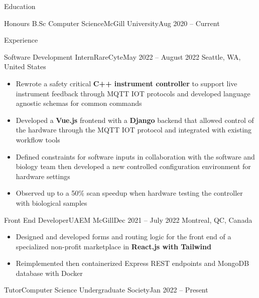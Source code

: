 \documentclass[]{mcdowellcv}
\begin{document}
\let\CITY=S

\let\WEB=F

\makeheader

\begin{cvsection}{Education}
	\begin{cvsubsection}{\normalfont Honours B.Sc Computer Science}{McGill University}{Aug 2020 -- Current}
	\end{cvsubsection}
	\vspace{-13mm}
\end{cvsection}
\begin{cvsection}{Experience}
	\begin{cvsubsection}{Software Development Intern}{RareCyte}{May 2022 -- August 2022}
		Seattle, WA, United States
		\begin{itemize}%
			\item Rewrote a safety critical \textbf{C++ instrument controller} to support live instrument feedback through MQTT IOT protocols and developed language agnostic schemas for common commands
			\item Developed a \textbf{Vue.js} frontend with a \textbf{Django} backend that allowed control of the hardware through the MQTT IOT protocol and integrated with existing workflow tools
			\item Defined constraints for software inputs in collaboration with the software and biology team then developed a new controlled configuration environment for hardware settings
			\item Observed up to a 50\% scan speedup when hardware testing the controller with biological samples
		\end{itemize}
	\end{cvsubsection}
	\begin{cvsubsection}{Front End Developer}{UAEM McGill}{Dec 2021 -- July 2022}
		\vspace{-2.5mm}
		Montreal, QC, Canada
		\begin{itemize}%
			\item Designed and developed forms and routing logic for the front end of a specialized non-profit marketplace in \textbf{React.js with Tailwind}
			\item Reimplemented then containerized Express REST endpoints and MongoDB database with Docker
		\end{itemize}
	\end{cvsubsection}
	\begin{cvsubsection}{Tutor}{Computer Science Undergraduate Society}{Jan 2022 -- Present}

\end{cvsubsection}
\end{cvsection}
\end{document}
